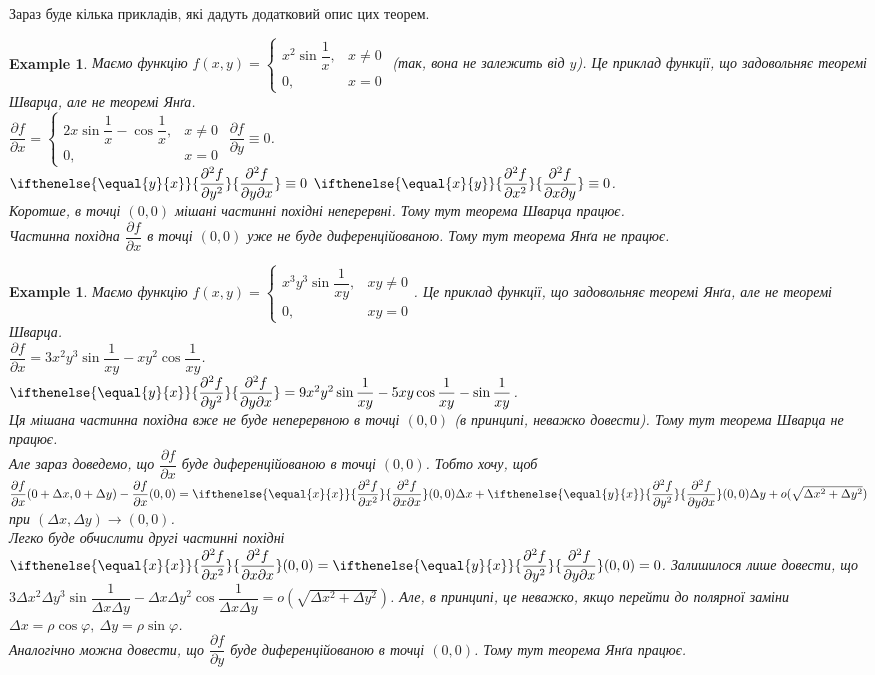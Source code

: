 \documentclass[a4paper, 10pt]{article}
\def\departial#1#2{\dfrac{\partial {#1}}{\partial {#2}}}
\def\seconddepartial#1#2#3{\ifthenelse{\equal{#2}{#3}}{\dfrac{\partial^2 {#1}}{\partial {#2}^2}}{\dfrac{\partial^2 {#1}}{\partial {#2} \partial {#3}}}}
\theoremstyle{theoremdd}
\theoremstyle{theoremdd}
\theoremstyle{theoremdd}
\theoremstyle{theoremdd}
\theoremstyle{theoremdd}
\newtheorem{example}[theorem]{Example}
\theoremstyle{theoremdd}
\theoremstyle{theoremdd}
\theoremstyle{theoremdd}
\theoremstyle{theoremdd}
\begin{document}
Зараз буде кілька прикладів, які дадуть додатковий опис цих теорем.

\begin{example}
Маємо функцію $f(x,y) = \begin{cases} x^2 \sin \dfrac{1}{x}, & x \neq 0 \\ 0, & x = 0 \end{cases}$ (так, вона не залежить від $y$). Це приклад функції, що задовольняє теоремі Шварца, але не теоремі Янґа.\\
$\departial{f}{x} = \begin{cases} 2x \sin \dfrac{1}{x} - \cos \dfrac{1}{x}, & x \neq 0 \\ 0, & x = 0 \end{cases}$ \qquad $\departial{f}{y} \equiv 0$.\\
$\seconddepartial{f}{y}{x} \equiv 0$ \qquad $\seconddepartial{f}{x}{y} \equiv 0$.\\
Коротше, в точці $(0,0)$ мішані частинні похідні неперервні. Тому тут теорема Шварца працює.\\
Частинна похідна $\departial{f}{x}$ в точці $(0,0)$ уже не буде диференційованою. Тому тут теорема Янґа не працює.
\end{example}

\begin{example}
Маємо функцію $f(x,y) = \begin{cases} x^3y^3 \sin \dfrac{1}{xy}, & xy \neq 0 \\ 0, & xy = 0 \end{cases}$. Це приклад функції, що задовольняє теоремі Янґа, але не теоремі Шварца.\\
$\departial{f}{x} = 3x^2 y^3 \sin \dfrac{1}{xy} - xy^2 \cos \dfrac{1}{xy}$.\\
$\seconddepartial{f}{y}{x} = 9x^2y^2 \sin \dfrac{1}{xy} - 5xy \cos \dfrac{1}{xy} - \sin \dfrac{1}{xy}$.\\
Ця мішана частинна похідна вже не буде неперервною в точці $(0,0)$ (в принципі, неважко довести). Тому тут теорема Шварца не працює.\\
Але зараз доведемо, що $\departial{f}{x}$ буде диференційованою в точці $(0,0)$. Тобто хочу, щоб $\departial{f}{x}(0+\Delta x,0+\Delta y) - \departial{f}{x}(0,0) = \seconddepartial{f}{x}{x}(0,0) \Delta x + \seconddepartial{f}{y}{x}(0,0) \Delta y + o(\sqrt{\Delta x^2 + \Delta y^2})$ при $(\Delta x, \Delta y) \to (0,0)$.\\
Легко буде обчислити другі частинні похідні $\seconddepartial{f}{x}{x}(0,0) = \seconddepartial{f}{y}{x}(0,0) = 0$. Залишилося лише довести, що $3 \Delta x^2 \Delta y^3 \sin \dfrac{1}{\Delta x \Delta y} - \Delta x \Delta y^2 \cos \dfrac{1}{\Delta x \Delta y} = o(\sqrt{\Delta x^2 + \Delta y^2})$. Але, в принципі, це неважко, якщо перейти до полярної заміни $\Delta x = \rho \cos \varphi,\ \Delta y = \rho \sin \varphi$.\\
Аналогічно можна довести, що $\departial{f}{y}$ буде диференційованою в точці $(0,0)$. Тому тут теорема Янґа працює.
\end{example}
\end{document}
